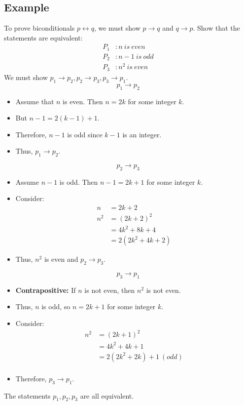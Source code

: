 \documentclass[letterpaper, 12pt]{math}
\begin{document}
\subsection*{Example}
To prove biconditionals \( p \leftrightarrow q \), we must show \( p \to q \)
and \( q \to p \). Show that the statements are equivalent:
\begin{align*}
  P_{1}&: n\ is\ even \\
  P_{2}&: n-1\ is\ odd \\
  P_{3}&: n^{2}\ is\ even
\end{align*}
We must show \( p_{1} \to p_{2}, p_{2} \to p_{3}, p_{3} \to p_{1} \).
\[ p_{1} \to p_{2} \]
\begin{itemize}
  \item Assume that \( n \) is even. Then \( n = 2k \) for some integer \( k \).
  \item But \( n-1 = 2(k-1)+1 \).
  \item Therefore, \( n-1 \) is odd since \( k-1 \) is an integer.
  \item Thus, \( p_{1} \to p_{2} \).
\end{itemize}
\[ p_{2} \to p_{3} \]
\begin{itemize}
  \item Assume \( n-1 \) is odd. Then \( n-1 = 2k+1 \) for some integer \( k \).
  \item Consider:
    \begin{align*}
      n &= 2k+2 \\
      n^{2} &= (2k+2)^{2} \\
      &= 4k^{2}+8k+4 \\
      &= 2(2k^{2}+4k+2)
    \end{align*}
  \item Thus, \( n^{2} \) is even and \( p_{2} \to p_{3} \).
\end{itemize}
\[ p_{3} \to p_{1} \]
\begin{itemize}
  \item \textbf{Contrapositive:} If \( n \) is not even, then \( n^{2} \) is not
    even.
  \item Thus, \( n \) is odd, so \( n = 2k+1 \) for some integer \( k \).
  \item Consider:
    \begin{align*}
      n^{2} &= (2k+1)^{2} \\
      &= 4k^{2}+4k+1 \\
      &= 2(2k^{2}+2k)+1\ (odd) \\
    \end{align*}
  \item Therefore, \( p_{3} \to p_{1} \).
\end{itemize}
The statements \( p_{1}, p_{2}, p_{3} \) are all equivalent.
\end{document}
